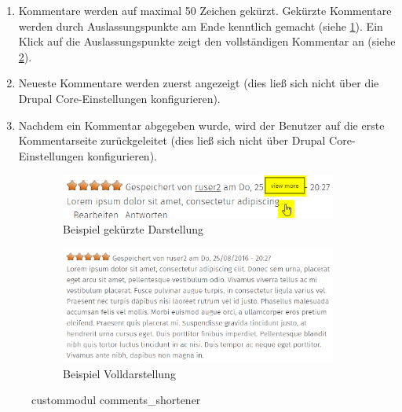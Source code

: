 \begin{enumerate}
	\item Kommentare werden auf maximal 50 Zeichen gekürzt. Gekürzte Kommentare werden durch Auslassungspunkte am Ende kenntlich gemacht (siehe \cref{fig:example_commentshortener_short}). Ein Klick auf die Auslassungspunkte zeigt den vollständigen Kommentar an (siehe \cref{fig:example_commentshortener_full}).

	\item Neueste Kommentare werden zuerst angezeigt (dies ließ sich nicht über die Drupal Core-Einstellungen konfigurieren).

	\item Nachdem ein Kommentar abgegeben wurde, wird der Benutzer auf die erste Kommentarseite zurückgeleitet (dies ließ sich nicht über Drupal Core-Einstellungen konfigurieren).
\end{enumerate}

\begin{figure}[H]
	\centering
	\begin{subfigure}[b]{0.45\textwidth}
		\centering
		\includegraphics[width=0.95\linewidth]{images/example_commentsshortener}
		\caption[]{Beispiel gekürzte Darstellung}
		\label{fig:example_commentshortener_short}
	\end{subfigure}
	\begin{subfigure}[b]{0.45\textwidth}
		\centering
		\includegraphics[width=0.95\linewidth]{images/example_commentsshortener_full}
		\caption[]{Beispiel Volldarstellung}
		\label{fig:example_commentshortener_full}
	\end{subfigure}
	\caption{\gls{custommodul} comments\_shortener}
	\label{fig:example_commentsshortener}
\end{figure}

